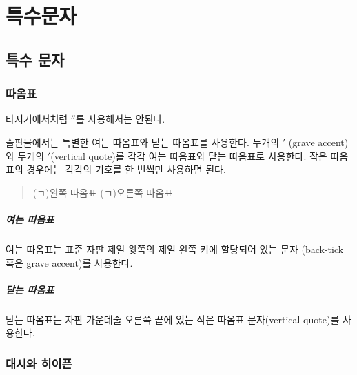 
%


	\chapter{특수문자}

		\newpage
		\minitoc				%



	\section{특수 문자}

		\subsection{따옴표}
			타지기에서처럼 $''$를 사용해서는 안된다. 
			
			출판물에서는 특별한 여는 따옴표와 닫는 따옴표를 사용한다. 
			 두개의 $'$ (grave accent)와 두개의 $'$(vertical quote)를 
			각각 여는 따옴표와 닫는 따옴표로 사용한다.
			작은 따옴표의 경우에는 각각의 기호를 한 번씩만 사용하면 된다.
		
			\begin{quote}
			(ㄱ)왼쪽 따옴표 (ㄱ)오른쪽 따옴표
			\end{quote}
		
			\paragraph{여는 따옴표}
			여는 따옴표는 표준 자판 제일 윗쪽의 제일 왼쪽 키에 할당되어 있는 문자
			(back-tick 혹은 grave accent)를 사용한다.
		
			\paragraph{닫는 따옴표}
			닫는 따옴표는 자판 가운데줄 오른쪽 끝에 있는 작은 따옴표 문자(vertical quote)를 사용한다.
		
		
		\subsection{대시와 히이픈}
				
